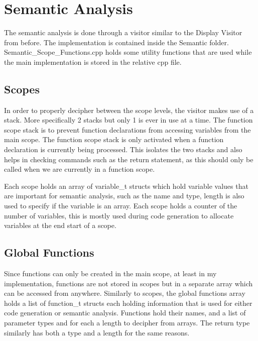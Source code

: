 \documentclass[12pt, a4paper]{report}
\begin{document}
\chapter{Semantic Analysis}
The semantic analysis is done through a visitor similar to the Display Visitor from before. The implementation is contained inside the Semantic folder. Semantic\_Scope\_Functions.cpp holds some utility functions that are used while the main implementation is stored in the relative cpp file.

\section{Scopes}
In order to properly decipher between the scope levels, the visitor makes use of a stack. More specifically 2 stacks but only 1 is ever in use at a time. The function scope stack is to prevent function declarations from accessing variables from the main scope. The function scope stack is only activated when a function declaration is currently being processed. This isolates the two stacks and also helps in checking commands such as the return statement, as this should only be called when we are currently in a function scope.

Each scope holds an array of variable\_t structs which hold variable values that are important for semantic analysis, such as the name and type, length is also used to specify if the variable is an array. Each scope holds a counter of the number of variables, this is mostly used during code generation to allocate variables at the end start of a scope.

\section{Global Functions}
Since functions can only be created in the main scope, at least in my implementation, functions are not stored in scopes but in a separate array which can be accessed from anywhere. Similarly to scopes, the global functions array holds a list of function\_t structs each holding information that is used for either code generation or semantic analysis. Functions hold their names, and a list of parameter types and for each a length to decipher from arrays. The return type similarly has both a type and a length for the same reasons.
\end{document}

